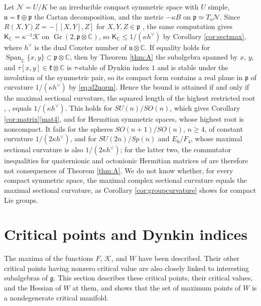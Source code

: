 \documentclass[leqno,10pt]{amsart}
\theoremstyle{definition}
\numberwithin{equation}{section}
\newcommand{\grass}{\operatorname{Gr}}
\newcommand{\sect}{\mathscr{K}}
\newcommand{\spn}{\operatorname{Span}}
\newcommand{\g}{\mathfrak{g}}
\newcommand{\p}{\mathfrak{p}}
\newcommand{\com}{\mathbb C}
\newcommand{\hv}{h^\vee}
\begin{document}
Let $\mathcal{N} = U/K$ be an irreducible compact symmetric space with $U$ simple, $\mathfrak{u} = \mathfrak{k} \oplus \p$ the Cartan decomposition, and the metric $-\kappa B$ on $\p \simeq T_{o}\mathcal{N}$. Since $R(X, Y)Z = -[[X, Y], Z]$ for $X, Y, Z \in \p$ \cite{Helgason}, the same computation gives $\mathsf{K}_{\com} = \kappa^{-1}\sect$ on $\grass(2, \p \otimes \com)$, so $\mathsf{K}_{\com} \leq 1/(\kappa\hv)$ by Corollary \ref{cor:sectmax}, where $\hv$ is the dual Coxeter number of $\mathfrak{u} \otimes \com$. If equality holds for $\spn_{\com}\{x, y\} \subset \p \otimes \com$, then by Theorem \ref{thm:A} the subalgebra spanned by $x$, $y$, and $\tau[x, y] \in \mathfrak{k} \otimes \com$ is $\tau$-stable of Dynkin index $1$ and is stable under the involution of the symmetric pair, so its compact form contains a real plane in $\p$ of curvature $1/(\kappa\hv)$ by \eqref{eq:sl2norm}. Hence the bound is attained if and only if the maximal sectional curvature, the squared length of the highest restricted root \cite[p.~334, Theorem~11.1]{Helgason-dgls}, \cite[Table~5.1]{Liu-curvatureestimates}, equals $1/(\kappa\hv)$. This holds for $SU(n)/SO(n)$, which gives Corollary \ref{cor:matrix}\ref{mat4}, and for Hermitian symmetric spaces, whose highest root is noncompact. It fails for the spheres $SO(n+1)/SO(n)$, $n \geq 4$, of constant curvature $1/(2\kappa\hv)$, and for $SU(2n)/Sp(n)$ and $E_{6}/F_{4}$, whose maximal sectional curvature is also $1/(2\kappa\hv)$; for the latter two, the commutator inequalities for quaternionic and octonionic Hermitian matrices of \cite[Theorem~6.3]{Fox-sectna} are therefore not consequences of Theorem \ref{thm:A}. We do not know whether, for every compact symmetric space, the maximal complex sectional curvature equals the maximal sectional curvature, as Corollary \ref{cor:groupcurvature} shows for compact Lie groups.

\section{Critical points and Dynkin indices}\label{sec:critical}
The maxima of the functions $F$, $\sect$, and $W$ have been described. Their other critical points having nonzero critical value are also closely linked to interesting subalgebras of $\g$. 
This section describes these critical points, their critical values, and the Hessian of $W$ at them, and shows that the set of maximum points of $W$ is a nondegenerate critical manifold.
\end{document}
